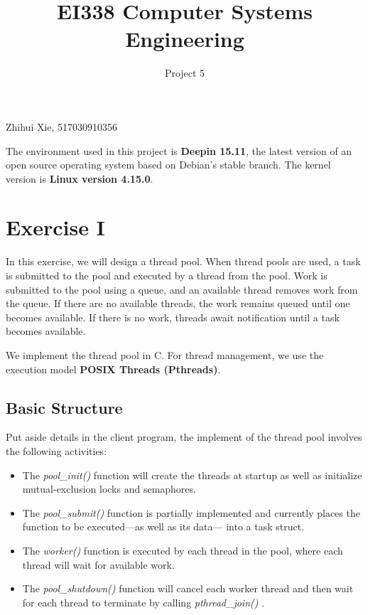 \documentclass{article}
\title{EI338 Computer Systems Engineering}
\author{Project 5}
\begin{document}
\maketitle

\begin{center}
    Zhihui Xie, 517030910356
\end{center}

The environment used in this project is \textbf{Deepin 15.11}, the latest version of an open source operating system based on Debian's stable branch. The kernel version is \textbf{Linux version 4.15.0}.

\section*{Exercise I}
In this exercise, we will design a thread pool. When thread pools are used, a
task is submitted to the pool and executed by a thread from the pool. Work is
submitted to the pool using a queue, and an available thread removes work
from the queue. If there are no available threads, the work remains queued
until one becomes available. If there is no work, threads await notification until
a task becomes available.

We implement the thread pool in C. For thread management, we use the execution model \textbf{POSIX Threads (Pthreads)}.

\subsection*{Basic Structure}
Put aside details in the client program, the implement of the thread pool involves the following activities:

\begin{itemize}
    \item The \textit{pool\_init()} function will create the threads at startup as well as initialize mutual-exclusion locks and semaphores.
    \item The \textit{pool\_submit()} function is partially implemented and currently
    places the function to be executed—as well as its data— into a task
    struct.
    \item The \textit{worker()} function is executed by each thread in the pool, where each
    thread will wait for available work.
    \item The \textit{pool\_shutdown()} function will cancel each worker thread and then
    wait for each thread to terminate by calling \textit{pthread\_join()} .
\end{itemize}
\end{document}
